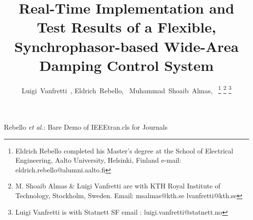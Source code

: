 \documentclass[journal]{IEEEtran}
\begin{document}
%
\title{Real-Time Implementation and Test Results of a Flexible, Synchrophasor-based Wide-Area Damping Control System}
%
%
%


\author{Luigi~Vanfretti~, Eldrich~Rebello,~
        Muhammad~Shoaib~Almas,~
\thanks{Eldrich Rebello completed his Master's degree at the School of Electrical Engineering, Aalto University, Helsinki, Finland
e-mail:  \mbox{eldrich.rebello@alumni.aalto.fi}}%
\thanks{M. Shoaib Almas \& Luigi Vanfretti are with KTH Royal Institute of Technology, Stockholm, Sweden. Email: msalmas@kth.se lvanfretti@kth.se}%
\thanks{Luigi Vanfretti is with Statnett SF email : luigi.vanfretti@statnett.no}}

% 
%



%
{Rebello \MakeLowercase{\textit{et al.}}: Bare Demo of IEEEtran.cls for Journals}
% 
\end{document}

